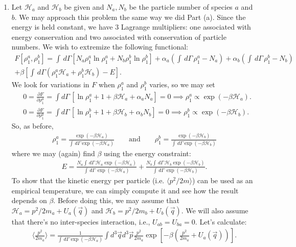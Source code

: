\documentclass{article}
\theoremstyle{definition}
\newcommand{\p}{\partial}
\newcommand{\ham}{\mathcal{H}}
\newcommand{\al}{\alpha}
\newcommand{\be}{\beta}
\newcommand{\f}[2]{\frac{#1}{#2}}
\newcommand{\lp}{\left(}
\newcommand{\rp}{\right)}
\newcommand{\lb}{\left[}
\newcommand{\rb}{\right]}
\begin{document}
\begin{enumerate}[label=(\alph*)]
	
	\item Let $\ham_a$ and $\ham_b$ be given and $N_a, N_b$ be the particle number of species $a$ and $b$. We may approach this problem the same way we did Part (a). Since the energy is held constant, we have 3 Lagrange multipliers: one associated with energy conservation and two associated with conservation of particle numbers. We wish to extremize the following functional:
	\begin{align*}
	F[\rho_1^a,\rho_1^b] = 
	\int \,d\Gamma \lb N_a \rho_1^a \ln \rho_1^a + N_b \rho_1^b \ln \rho_1^b \rb + 
	\al_a \lp \int \,d\Gamma\, \rho_1^a - N_a \rp
	+ \al_b \lp \int \,d\Gamma\, \rho_1^b - N_b \rp\\
	+ \be \lb \int \,d\Gamma (\rho_1^a\ham_a + \rho_1^b\ham_b) - E \rb.
	\end{align*}
	We look for variations in $F$ when $\rho_1^a$ and $\rho_1^b$ varies, so we may set
	\begin{align*}
	&0 = \f{\p F}{\p \rho_1^a} = \int d\Gamma \, \lb \ln \rho_1^a + 1 + \be \ham_a + \al_a N_a \rb = 0\implies \rho_1^a \propto \exp(-\be \ham_a).\\
	&0 = \f{\p F}{\p \rho_1^b} = \int d\Gamma \, \lb \ln \rho_1^b + 1 + \be \ham_b + \al_b N_b \rb = 0\implies \rho_1^b \propto \exp(-\be \ham_b).
	\end{align*}
	So, as before, 
	\begin{align*}
	\rho_1^a = \f{\exp(-\be \ham_a)}{\int \,d\Gamma \exp(-\be \ham_a)} \quad\quad \text{and} \quad\quad 
	\rho_1^b = \f{\exp(-\be \ham_b)}{\int \,d\Gamma \exp(-\be \ham_b)}
	\end{align*}
	where we may (again) find $\be$ using the energy constraint:
	\begin{align*}
	E = \f{N_a\int \,d\Gamma \, \ham_a \exp(-\be \ham_a)}{\int \,d\Gamma \, \exp(-\be \ham_a)} + 
	\f{N_b\int \,d\Gamma \, \ham_b \exp(-\be \ham_b)}{\int \,d\Gamma \, \exp(-\be \ham_b)}.
	\end{align*}
	To show that the kinetic energy per particle (i.e. $\langle p^2/2m \rangle$) can be used as an empirical temperature, we can simply compute it and see how the result depends on $\be$. Before doing this, we may assume that $\ham_a = p^2/2m_a + U_a(\vec{q})$ and $\ham_b = p^2/2m_b + U_b(\vec{q})$. We will also assume that there's no inter-species interaction, i.e., $U_{ab} = U_{ba} = 0$. Let's calculate:
	\begin{align*}
	\langle \f{p^2}{2m_a} \rangle = \f{1}{\int\,d\Gamma \exp(-\be \ham_a)} \int d^3 \vec{q}  d^3\vec{p} \f{p^2}{2m_a} \exp\lb -\be \lp \f{p^2}{2m_a} + U_a(\vec{q}) \rp \rb.

\end{align*}
\end{enumerate}
\end{document}

